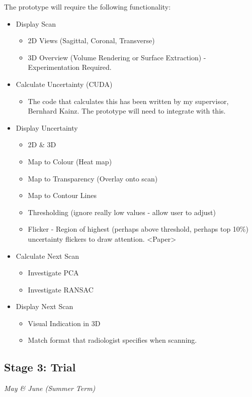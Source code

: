 \documentclass[
  oneside,
  11pt, a4paper,
  footinclude=true,
  headinclude=true,
  cleardoublepage=empty
]{scrbook}
\begin{document}
The prototype will require the following functionality:
\begin{itemize}
	\item Display Scan
	\begin{itemize}
		\item 2D Views (Sagittal, Coronal, Transverse)
		\item 3D Overview (Volume Rendering or Surface Extraction) - Experimentation Required.
	\end{itemize}
	\item Calculate Uncertainty (CUDA)
	\begin{itemize}
		\item The code that calculates this has been written by my supervisor, Bernhard Kainz. The prototype will need to integrate with this.
	\end{itemize}
	\item Display Uncertainty
	\begin{itemize}
		\item 2D \& 3D
		\item Map to Colour (Heat map)
		\item Map to Transparency (Overlay onto scan)
		\item Map to Contour Lines
		\item Thresholding (ignore really low values - allow user to adjust)
		\item Flicker - Region of highest (perhaps above threshold, perhaps top 10\%) uncertainty flickers to draw attention. <Paper>
	\end{itemize}
	\item Calculate Next Scan
	\begin{itemize}
		\item Investigate PCA
		\item Investigate RANSAC
	\end{itemize}
	\item Display Next Scan
	\begin{itemize}
		\item Visual Indication in 3D
		\item Match format that radiologist specifies when scanning.
	\end{itemize}
\end{itemize}

\subsection*{Stage 3: Trial}
\textit{May \& June (Summer Term)}
\end{document}

